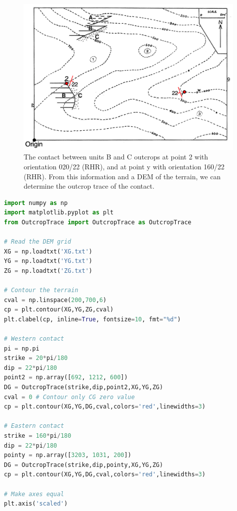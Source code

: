 \documentclass[a4paper , 12pt]{book}
\begin{document}
 \begin{figure}[ht]
    \centering
    \includegraphics[width=11.8cm]{Figures/ch5f5.png}
    \caption{The contact between units B and C outcrops at point 2 with orientation 020/22 (RHR), and at point y with orientation 160/22 (RHR). From this information and a DEM of the terrain, we can determine the outcrop trace of the contact.}
\end{figure}

\begin{center}
\begin{lstlisting}[language=Python, frame=single]
import numpy as np
import matplotlib.pyplot as plt
from OutcropTrace import OutcropTrace as OutcropTrace

# Read the DEM grid
XG = np.loadtxt('XG.txt')
YG = np.loadtxt('YG.txt')
ZG = np.loadtxt('ZG.txt')

# Contour the terrain
cval = np.linspace(200,700,6)
cp = plt.contour(XG,YG,ZG,cval)
plt.clabel(cp, inline=True, fontsize=10, fmt="%d")

# Western contact
pi = np.pi
strike = 20*pi/180
dip = 22*pi/180
point2 = np.array([692, 1212, 600])
DG = OutcropTrace(strike,dip,point2,XG,YG,ZG)
cval = 0 # Contour only CG zero value
cp = plt.contour(XG,YG,DG,cval,colors='red',linewidths=3)

# Eastern contact
strike = 160*pi/180
dip = 22*pi/180
pointy = np.array([3203, 1031, 200])
DG = OutcropTrace(strike,dip,pointy,XG,YG,ZG)
cp = plt.contour(XG,YG,DG,cval,colors='red',linewidths=3)

# Make axes equal
plt.axis('scaled')
\end{lstlisting}
\end{center}
\end{document}
